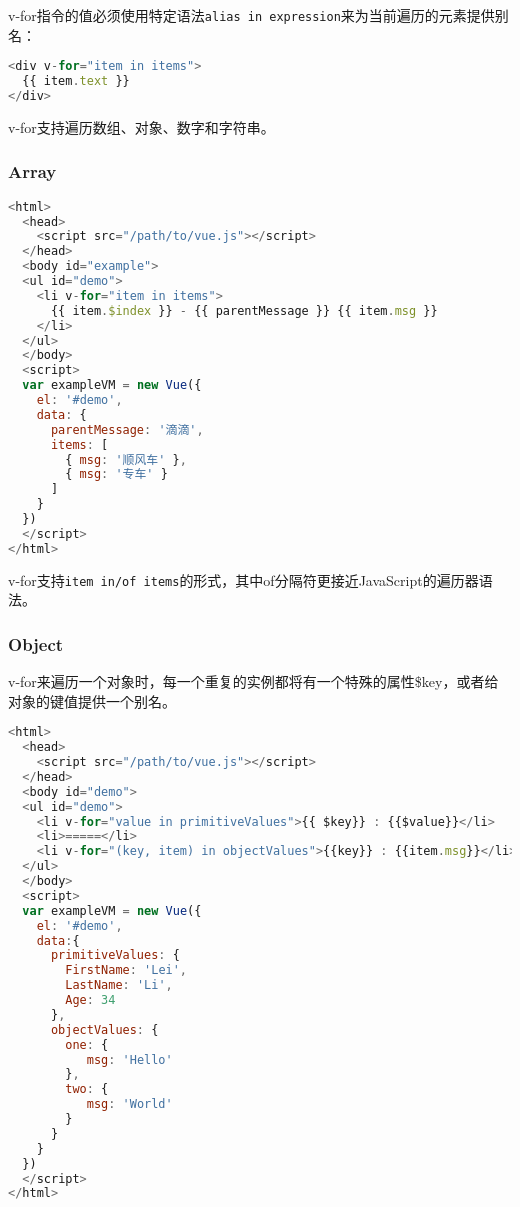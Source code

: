 v-for指令的值必须使用特定语法\texttt{alias in expression}来为当前遍历的元素提供别名：


\begin{lstlisting}[language=JavaScript]
<div v-for="item in items">
  {{ item.text }}
</div>
\end{lstlisting}

v-for支持遍历数组、对象、数字和字符串。

\subsubsection{Array}



\begin{lstlisting}[language=JavaScript]
<html>
  <head>
    <script src="/path/to/vue.js"></script>
  </head>
  <body id="example">
  <ul id="demo">
    <li v-for="item in items">
      {{ item.$index }} - {{ parentMessage }} {{ item.msg }}
    </li>
  </ul>
  </body>
  <script>
  var exampleVM = new Vue({
    el: '#demo',
    data: {
      parentMessage: '滴滴',
      items: [
        { msg: '顺风车' },
        { msg: '专车' }
      ]
    }
  })
  </script>
</html>
\end{lstlisting}



v-for支持\texttt{item in/of items}的形式，其中of分隔符更接近JavaScript的遍历器语法。

\subsubsection{Object}

v-for来遍历一个对象时，每一个重复的实例都将有一个特殊的属性\$key，或者给对象的键值提供一个别名。



\begin{lstlisting}[language=JavaScript]
<html>
  <head>
    <script src="/path/to/vue.js"></script>
  </head>
  <body id="demo">
  <ul id="demo">
    <li v-for="value in primitiveValues">{{ $key}} : {{$value}}</li>
    <li>=====</li>
    <li v-for="(key, item) in objectValues">{{key}} : {{item.msg}}</li>
  </ul>
  </body>
  <script>
  var exampleVM = new Vue({
    el: '#demo',
    data:{
      primitiveValues: {
        FirstName: 'Lei',
        LastName: 'Li',
        Age: 34
      },
      objectValues: {
        one: {
           msg: 'Hello'
        },
        two: {
           msg: 'World'
        }
      }
    }
  })
  </script>
</html>
\end{lstlisting}

